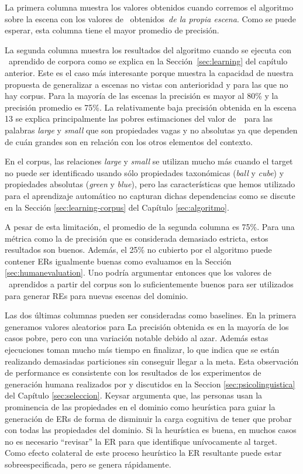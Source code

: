 \begin{table}[H]
La primera columna muestra los valores obtenidos cuando corremos el algoritmo sobre la escena
con los valores de \puse\ obtenidos~\emph{de la propia escena}. Como se puede esperar,
esta columna tiene el mayor promedio de precisi\'on.

La segunda columna muestra los resultados del algoritmo cuando se ejecuta con \puse\ aprendido de
corpora como se explica en la Secci\'on~\ref{sec:learning} del cap\'itulo anterior. Este es el caso m\'as interesante porque muestra la capacidad de nuestra propuesta de generalizar a escenas no vistas con anterioridad y para las que no hay corpus. Para la mayor\'{i}a de las escenas la precisi\'on
es mayor al 80\% y la precisi\'on promedio es 75\%. La relativamente baja precisi\'on
obtenida en la escena 13 se explica principalmente las pobres estimaciones del valor de~\puse\ para las palabras \emph{large} y \emph{small} que son propiedades vagas y no absolutas ya que dependen de cu\'an grandes son en relaci\'on con los otros elementos del contexto.  

En el corpus, las relaciones \emph{large} y \emph{small} se utilizan mucho m\'as cuando el target no puede ser identificado usando s\'olo propiedades taxon\'omicas (\emph{ball} y \emph{cube}) y propiedades absolutas (\emph{green} y \emph{blue}), pero las caracter\'{i}sticas que hemos utilizado para el aprendizaje autom\'atico no capturan dichas dependencias como se discute en la Secci\'on \ref{sec:learning-corpus} del Cap\'itulo \ref{sec:algoritmo}.

A pesar de esta limitaci\'on, el promedio de la segunda columna es 75\%. Para una m\'etrica como la de precisi\'on que es considerada demasiado estricta, estos resultados son buenos. Adem\'as, el 25\% no cubierto por el algoritmo puede contener ERs igualmente buenas como evaluamos en la Secci\'on \ref{sec:humanevaluation}. Uno podr\'ia argumentar entonces que los valores de \puse\ aprendidos a partir del corpus son lo suficientemente buenos para ser utilizados para generar REs para nuevas escenas del dominio.

Las dos \'ultimas columnas pueden ser consideradas como baselines. En la primera generamos
valores aleatorios para \puse\. La precisi\'on obtenida es en la mayor\'{i}a de los casos pobre, pero con
una variaci\'on notable debido al azar. Adem\'as estas ejecuciones toman mucho m\'as tiempo en finalizar, lo que indica que se est\'an realizando demasiadas particiones sin conseguir llegar a la meta. Esta observaci\'on de performance es consistente con los resultados de los experimentos de generaci\'on humana realizados por \cite{keysar:Curr98,} y discutidos en la Seccion \ref{sec:psicolinguistica} del Cap\'itulo \ref{sec:seleccion}. Keysar argumenta que, las personas usan la prominencia de las propiedades en el dominio como heur\'istica para guiar la generaci\'on de ERs de forma de disminuir la carga cognitiva de tener que probar con todas las propiedades del dominio. Si la heur\'istica es buena, en muchos casos no es necesario ``revisar'' la ER para que identifique un\'ivocamente al target. Como efecto colateral de este proceso heur\'istico la ER resultante puede estar sobreespecificada, pero se genera r\'apidamente.  


\end{table}
